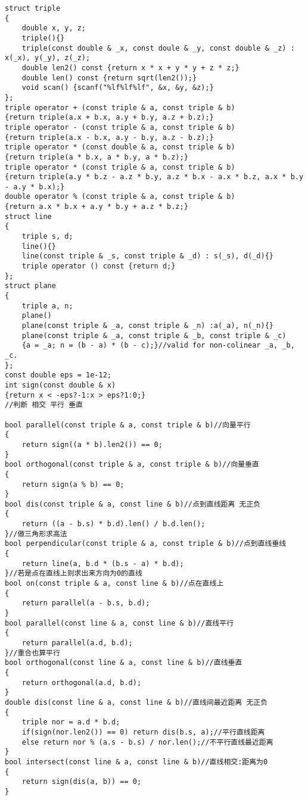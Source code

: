\begin{lstlisting}
struct triple
{
    double x, y, z;
    triple(){}
    triple(const double & _x, const doule & _y, const double & _z) : x(_x), y(_y), z(_z);
    double len2() const {return x * x + y * y + z * z;}
    double len() const {return sqrt(len2());}
    void scan() {scanf("%lf%lf%lf", &x, &y, &z);}
};
triple operator + (const triple & a, const triple & b)
{return triple(a.x + b.x, a.y + b.y, a.z + b.z);}
triple operator - (const triple & a, const triple & b)
{return triple(a.x - b.x, a.y - b.y, a.z - b.z);}
triple operator * (const double & a, const triple & b)
{return triple(a * b.x, a * b.y, a * b.z);}
triple operator * (const triple & a, const triple & b)
{return triple(a.y * b.z - a.z * b.y, a.z * b.x - a.x * b.z, a.x * b.y - a.y * b.x);}
double operator % (const triple & a, const triple & b)
{return a.x * b.x + a.y * b.y + a.z * b.z;}
struct line
{
    triple s, d;
    line(){}
    line(const triple & _s, const triple & _d) : s(_s), d(_d){}
    triple operator () const {return d;}
};
struct plane
{
    triple a, n;
    plane()
    plane(const triple & _a, const triple & _n) :a(_a), n(_n){}
    plane(const triple & _a, const triple & _b, const triple & _c)
    {a = _a; n = (b - a) * (b - c);}//valid for non-colinear _a, _b, _c.
};
const double eps = 1e-12;
int sign(const double & x)
{return x < -eps?-1:x > eps?1:0;}
//判断 相交 平行 垂直

bool parallel(const triple & a, const triple & b)//向量平行
{
    return sign((a * b).len2()) == 0;
}
bool orthogonal(const triple & a, const triple & b)//向量垂直
{
    return sign(a % b) == 0;
}
bool dis(const triple & a, const line & b)//点到直线距离 无正负
{
    return ((a - b.s) * b.d).len() / b.d.len();
}//做三角形求高法
bool perpendicular(const triple & a, const triple & b)//点到直线垂线
{
    return line(a, b.d * (b.s - a) * b.d);
}//若是点在直线上则求出来方向为0的直线
bool on(const triple & a, const line & b)//点在直线上
{
    return parallel(a - b.s, b.d);
}
bool parallel(const line & a, const line & b)//直线平行
{
    return parallel(a.d, b.d);
}//重合也算平行
bool orthogonal(const line & a, const line & b)//直线垂直
{
    return orthogonal(a.d, b.d);
}
double dis(const line & a, const line & b)//直线间最近距离 无正负
{
    triple nor = a.d * b.d;
    if(sign(nor.len2()) == 0) return dis(b.s, a);//平行直线距离
    else return nor % (a.s - b.s) / nor.len();//不平行直线最近距离
}
bool intersect(const line & a, const line & b)//直线相交:距离为0
{
    return sign(dis(a, b)) == 0;
}


\end{lstlisting}
